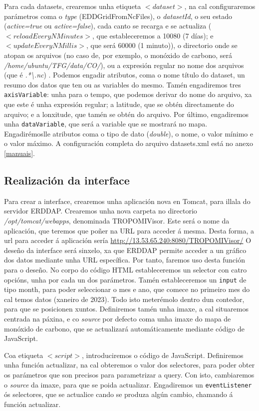 Para cada datasets, crearemos unha etiqueta $<dataset>$, na cal configuraremos parámetros coma o \textit{type} (EDDGridFromNcFiles), o \textit{datasetId}, o seu estado (\textit{active=true} ou \textit{active=false}),
cada canto se recarga e se actualiza ($<reloadEveryNMinutes>$, que estableceremos a 10080 (7 días); e \break$<updateEveryNMillis>$, que será 60000 (1 minuto)), o directorio onde se atopan os
arquivos (no caso de, por exemplo, o monóxido de carbono, será \textit{/home/ubuntu/TFG/data/CO/}), ou a expresión regular no nome dos arquivos (que é \textit{.*\textbackslash.nc}) . Podemos
engadir atributos, coma o nome título do dataset, un resumo dos datos que ten ou as variables do mesmo. Tamén engadiremos tres \texttt{axisVariable}: unha para o tempo, que podemos derivar do nome
do arquivo, xa que este é unha expresión regular; a latitude, que se obtén directamente do arquivo; e a lonxitude, que tamén se obtén do arquivo. Por último, engadiremos unha \texttt{dataVariable}, que
será a variable que se mostrará no mapa. Engadirémoslle atributos coma o tipo de dato (\textit{double}), o nome, o valor mínimo e o valor máximo. A configuración completa do arquivo datasets.xml
está no anexo \ref{manuais}.


\subsection{Realización da interface}\label{interface}
Para crear a interface, crearemos unha aplicación nova en Tomcat, para illala do servidor ERDDAP. Crearemos unha nova carpeta no directorio \textit{/opt/tomcat/webapps}, denominada TROPOMIVisor.
Este será o nome da aplicación, que teremos que poñer na URL para acceder á mesma. Desta forma, a url para acceder á aplicación sería \url{http://13.53.65.240:8080/TROPOMIVisor/}
O deseño da interface será sinxelo, xa que ERDDAP permite acceder a un gráfico dos datos mediante unha URL específica. Por tanto, faremos uso desta función para o deseño. No corpo do código HTML
estableceremos un selector con catro opcións, unha por cada un dos parámetros. Tamén estableceremos un \texttt{input} de tipo month, para poder seleccionar o mes e ano, que comece no primeiro mes
do cal temos datos (xaneiro de 2023). Todo isto meterémolo dentro dun contedor, para que se posicionen xuntos. Definiremos tamén unha imaxe, a cal situaremos centrada na páxina, e co \textit{source}
por defecto coma unha imaxe do mapa de monóxido de carbono, que se actualizará automáticamente mediante código de JavaScript.

Coa etiqueta $<script>$, introduciremos o código de JavaScript. Definiremos unha función actualizar, na cal obteremos o valor dos selectores, para poder obter os parámetros que son precisos para
parametrizar a query. Con isto, cambiaremos o \textit{source} da imaxe, para que se poida actualizar. Engadiremos un \texttt{eventListener} ós selectores, que se actualice cando se produza algún
cambio, chamando á función actualizar.
